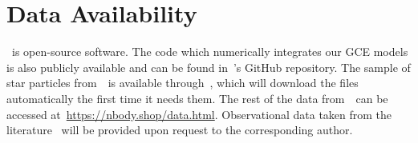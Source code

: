 \documentclass[ms.tex]{subfiles}
\begin{document}
\section{Data Availability}
\vice~is open-source software.
The code which numerically integrates our GCE models is also publicly
available and can be found in~\vice's GitHub repository.
The sample of star particles from~\hsim~is available through~\vice, which will
download the files automatically the first time it needs them.
The rest of the data from~\hsim~can be accessed
at~\url{https://nbody.shop/data.html}.
Observational data taken from the literature~\citep[e.g.][]{Dopita2016,
Schaefer2020, Vincenzo2021} will be provided upon request to the corresponding
author.
\end{document}
